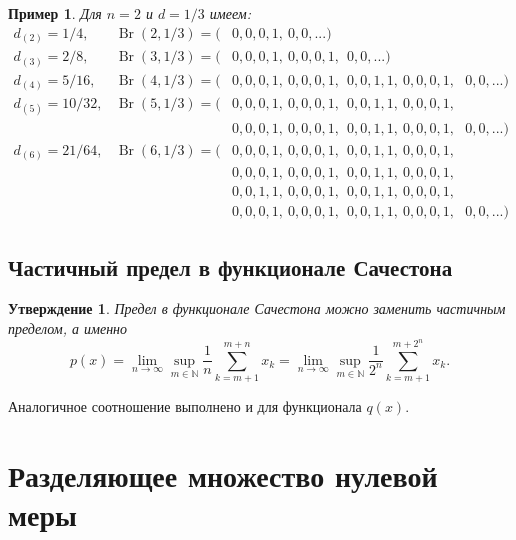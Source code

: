 \documentclass[a4paper,14pt]{article} %
\theoremstyle{plain}
\newtheorem{example}[lemma]{Пример}
\newtheorem{proposition}[lemma]{Утверждение}
\begin{document}
\begin{example}
	Для $n=2$ и $d=1/3$ имеем:
	\begin{equation*}
		\begin{array}{lll}
			d_{(2)} = 1/4, &
			\operatorname{Br}(2,1/3) = (&0,0,0,1, \ 0,0,...)
			\\
			d_{(3)} = 2/8, &
			\operatorname{Br}(3,1/3) = (&0,0,0,1, \ 0,0,0,1, \ \   0,0,...)
			\\
			d_{(4)} = 5/16, &
			\operatorname{Br}(4,1/3) = (&0,0,0,1, \ 0,0,0,1, \ \   0,0,1,1, \ 0,0,0,1, \ \ \  0,0,...)
			\\
			d_{(5)} = 10/32, &
			\operatorname{Br}(5,1/3) = (&
			                             0,0,0,1, \ 0,0,0,1, \ \   0,0,1,1, \ 0,0,0,1,\\&
			                           & 0,0,0,1, \ 0,0,0,1, \ \   0,0,1,1, \ 0,0,0,1,
			\ \ \ 0,0,...)
			\\
			d_{(6)} = 21/64, &
			\operatorname{Br}(6,1/3) = (&
			                             0,0,0,1, \ 0,0,0,1, \ \   0,0,1,1, \ 0,0,0,1,\\&
			                           & 0,0,0,1, \ 0,0,0,1, \ \   0,0,1,1, \ 0,0,0,1,\\&
			                           & 0,0,1,1, \ 0,0,0,1, \ \   0,0,1,1, \ 0,0,0,1,\\&
			                           & 0,0,0,1, \ 0,0,0,1, \ \   0,0,1,1, \ 0,0,0,1,
			\ \ \ 0,0,...)
		\end{array}
	\end{equation*}
\end{example}

\subsection{Частичный предел в функционале Сачестона}

\begin{proposition}
	\label{prop:Sucheston_partial_limit}
	Предел в функционале Сачестона можно заменить частичным пределом, а именно
	\begin{equation*}
		p(x) = \lim_{n\to\infty} \sup_{m\in\mathbb{N}}  \frac{1}{n} \sum_{k=m+1}^{m+n} x_k
		= \lim_{n\to\infty} \sup_{m\in\mathbb{N}}  \frac{1}{2^n} \sum_{k=m+1}^{m+2^n} x_k
		.
	\end{equation*}
\end{proposition}
Аналогичное соотношение выполнено и для функционала $q(x)$.

\section{Разделяющее множество нулевой меры}
\end{document}
